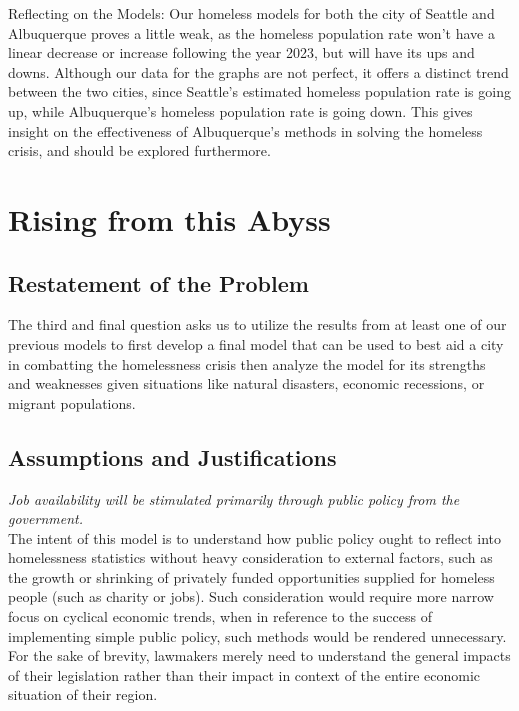 \documentclass[12pt]{article}
\begin{document}
Reflecting on the Models: Our homeless models for both the city of Seattle and Albuquerque proves a little weak, as the homeless population rate won’t have a linear decrease or increase following the year 2023, but will have its ups and downs. Although our data for the graphs are not perfect, it offers a distinct trend between the two cities, since Seattle’s estimated homeless population rate is going up, while Albuquerque’s homeless population rate is going down. This gives insight on the effectiveness of Albuquerque’s methods in solving the homeless crisis, and should be explored furthermore.

\newpage

\section{Rising from this Abyss}

\subsection{Restatement of the Problem}
The third and final question asks us to utilize the results from at least one of our previous models to first develop a final
model that can be used to best aid a city in combatting the homelessness crisis then analyze the model for its
strengths and weaknesses given situations like natural disasters, economic recessions, or migrant populations.

\subsection{Assumptions and Justifications}
\textit{Job availability will be stimulated primarily through public policy from the government.} \\

\noindent
The intent of this model is to understand how public policy ought to reflect into homelessness statistics without
heavy consideration to external factors, such as the growth or shrinking of privately funded opportunities
supplied for homeless people (such as charity or jobs). Such consideration would require more narrow focus on cyclical
economic trends, when in reference to the success of implementing simple public policy, such methods would be rendered
unnecessary. For the sake of brevity, lawmakers merely need to understand the general impacts of their legislation rather than their impact in
context of the entire economic situation of their region.
\end{document}
